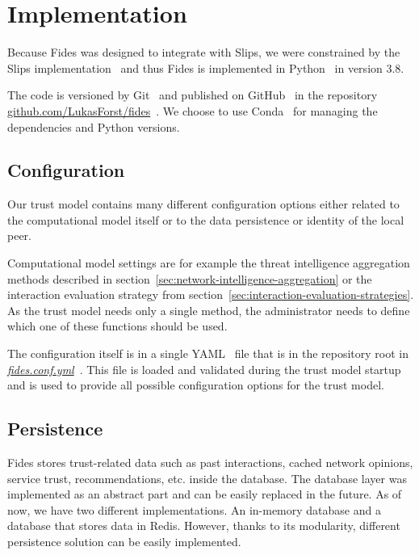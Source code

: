 \section{Implementation}
\label{sec:implementation}
Because Fides was designed to integrate with Slips, we were constrained by the Slips implementation~\cite{slips} and thus Fides is implemented in Python~\cite{python} in version 3.8.

The code is versioned by Git~\cite{git} and published on GitHub~\cite{github} in the repository \href{https://github.com/LukasForst/fides}{github.com/LukasForst/fides}~\cite{fidesGithub}.
We choose to use Conda~\cite{conda} for managing the dependencies and Python versions.

\subsection{Configuration}
\label{subsec:configuration}
Our trust model contains many different configuration options either related to the computational model itself or to the data persistence or identity of the local peer.

Computational model settings are for example the threat intelligence aggregation methods described in section~\ref{sec:network-intelligence-aggregation} or the interaction evaluation strategy from section~\ref{sec:interaction-evaluation-strategies}.
As the trust model needs only a single method, the administrator needs to define which one of these functions should be used.

The configuration itself is in a single YAML~\cite{yaml} file that is in the repository root in \href{https://github.com/LukasForst/fides/blob/master/fides.conf.yml}{\textit{fides.conf.yml}}~\cite{fidesGithub}.
This file is loaded and validated during the trust model startup and is used to provide all possible configuration options for the trust model.

\subsection{Persistence}
\label{subsec:persistence}
Fides stores trust-related data such as past interactions, cached network opinions, service trust, recommendations, etc. inside the database.
The database layer was implemented as an abstract part and can be easily replaced in the future.
As of now, we have two different implementations. An in-memory database and a database that stores data in Redis.
However, thanks to its modularity, different persistence solution can be easily implemented.

